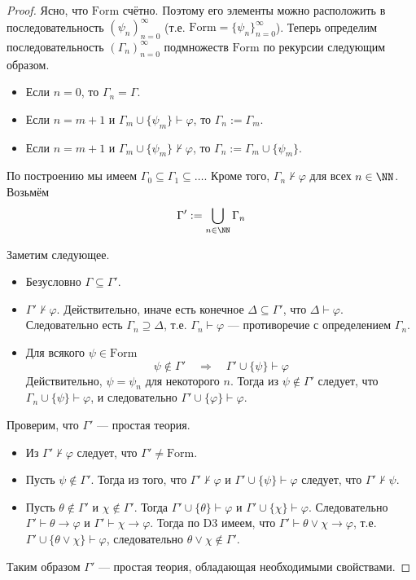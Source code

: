 \documentclass[12pt,a4paper]{article}
\newcommand{\Formul}{\ensuremath{\mathrm{Form}}\xspace}
\begin{document}
    \begin{proof}
        Ясно, что $\Formul$ счётно. Поэтому его элементы можно расположить в последовательность $(\psi_n)_{n=0}^\infty$ (т.е. $\Formul = \{\psi_n\}_{n=0}^\infty$). Теперь определим последовательность $(\Gamma_n)_{n=0}^\infty$ подмножеств $\Formul$ по рекурсии следующим образом.
        \begin{itemize}
            \item Если $n=0$, то $\Gamma_n = \Gamma$.
            \item Если $n = m + 1$ и $\Gamma_m \cup \{\psi_m\} \vdash \varphi$, то $\Gamma_n := \Gamma_m$.
            \item Если $n = m + 1$ и $\Gamma_m \cup \{\psi_m\} \nvdash \varphi$, то $\Gamma_n := \Gamma_m \cup \{\psi_m\}$.
        \end{itemize}
        По построению мы имеем $\Gamma_0 \subseteq \Gamma_1 \subseteq \dots$. Кроме того, $\Gamma_n \nvdash \varphi$ для всех $n \in \NN$. Возьмём
        \[\Gamma' := \bigcup_{n \in \NN} \Gamma_n\]

        Заметим следующее.
        \begin{itemize}
            \item Безусловно $\Gamma \subseteq \Gamma'$.
            \item $\Gamma' \nvdash \varphi$. Действительно, иначе есть конечное $\Delta \subseteq \Gamma'$, что $\Delta \vdash \varphi$. Следовательно есть $\Gamma_n \supseteq \Delta$, т.е. $\Gamma_n \vdash \varphi$ --- противоречие с определением $\Gamma_n$.
            \item Для всякого $\psi \in \Formul$
                \[\psi \notin \Gamma' \quad \Longrightarrow \quad \Gamma' \cup \{\psi\} \vdash \varphi\]
                Действительно, $\psi = \psi_n$ для некоторого $n$. Тогда из $\psi \notin \Gamma'$ следует, что $\Gamma_n \cup \{\psi\} \vdash \varphi$, и следовательно $\Gamma' \cup \{\varphi\} \vdash \varphi$.
        \end{itemize}

        Проверим, что $\Gamma'$ --- простая теория.
        \begin{itemize}
            \item Из $\Gamma' \nvdash \varphi$ следует, что $\Gamma' \neq \Formul$.
            \item Пусть $\psi \notin \Gamma'$. Тогда из того, что $\Gamma' \nvdash \varphi$ и $\Gamma' \cup \{\psi\} \vdash \varphi$ следует, что $\Gamma' \nvdash \psi$.
            \item Пусть $\theta \notin \Gamma'$ и $\chi \notin \Gamma'$. Тогда $\Gamma' \cup \{\theta\} \vdash \varphi$ и $\Gamma' \cup \{\chi\} \vdash \varphi$. Следовательно $\Gamma' \vdash \theta \rightarrow \varphi$ и $\Gamma' \vdash \chi \rightarrow \varphi$. Тогда по $\mathrm{D3}$ имеем, что $\Gamma' \vdash \theta \vee \chi \rightarrow \varphi$, т.е. $\Gamma' \cup \{\theta \vee \chi\} \vdash \varphi$, следовательно $\theta \vee \chi \notin \Gamma'$.
        \end{itemize}

        Таким образом $\Gamma'$ --- простая теория, обладающая необходимыми свойствами.
    \end{proof}
\end{document}
